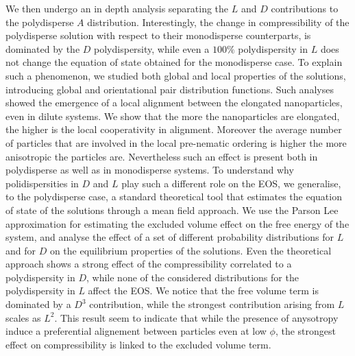 \documentclass[journal=jacsat,manuscript=article]{achemso}
\begin{document}
We then undergo an in depth analysis separating the $L$ and $D$ contributions to the polydisperse $A$ distribution. 
Interestingly, the change in compressibility of the polydisperse solution with respect to their monodisperse counterparts, is dominated by the  $D$ polydispersity, while even a $100\%$ polydispersity in $L$ does not change the  equation of state obtained for the monodisperse case. To explain such a phenomenon, we studied both global and local properties of the solutions, introducing global and orientational pair distribution functions. Such analyses showed the emergence of a local alignment between the elongated nanoparticles, even in dilute systems. 
We show that the more the nanoparticles are elongated, the higher is the local cooperativity in alignment. Moreover the average number of particles that are involved in the local pre-nematic ordering is higher the more anisotropic the particles  are.
Nevertheless such an effect is present both in polydisperse as well as in monodisperse systems. 
To understand why polidispersities in $D$ and $L$ play such a different role on the EOS, we  generalise, to the polydisperse case,  a standard theoretical tool that estimates the equation of state of the solutions through a mean field approach. We use the Parson Lee approximation for estimating the excluded volume effect on the free energy of the system, and analyse the effect of a set of different probability  distributions for $L$ and for $D$ on the equilibrium properties of the solutions. 
Even the theoretical approach shows a strong effect of the compressibility correlated to a polydispersity in $D$, while none of the considered distributions for the polydispersity in $L$ affect the EOS.  We notice that the free volume term is dominated by a $D^3$ contribution, while the strongest contribution arising from $L$ scales as $L^2$. This result seem to indicate that while the presence of anysotropy induce a preferential alignement between particles even at low $\phi$, the strongest effect on compressibility is linked to the excluded volume term. 

\end{document}
